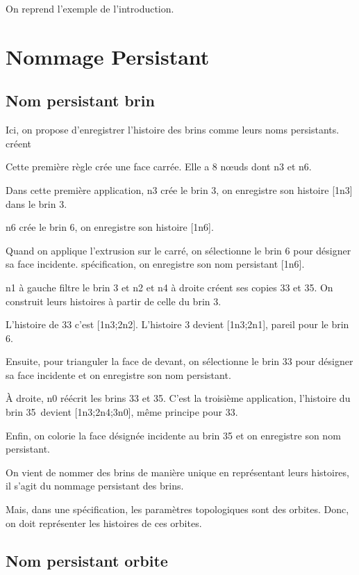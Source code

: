 \documentclass[11pt]{article}
\begin{document}
On reprend l'exemple de l'introduction.
\section{Nommage Persistant}
\label{sec:org84648da}

\subsection{Nom persistant brin}
\label{sec:org53f1b92}

Ici, on propose d'enregistrer l'histoire des brins comme leurs noms persistants.
créent %

Cette première règle crée une face carrée. Elle a 8 nœuds dont n3 et n6.

Dans cette première application, n3 crée le brin 3, on enregistre son histoire
[1n3] dans le brin 3.

n6 crée le brin 6, on enregistre son histoire [1n6].

Quand on applique l'extrusion sur le carré, on sélectionne le brin 6 pour
désigner sa face incidente. %
spécification, on enregistre son nom persistant [1n6].

n1 à gauche filtre le brin 3 et n2 et n4 à droite créent ses copies 33 et 35. %
On construit leurs histoires à partir de celle du brin 3. %

L'histoire de 33 c'est [1n3;2n2]. %
L'histoire 3 devient [1n3;2n1], pareil pour le brin 6. %

Ensuite, pour trianguler la face de devant, on sélectionne le brin 33 pour
désigner sa face incidente et on enregistre son nom persistant.

À droite, n0 réécrit les brins 33 et 35. C'est la troisième application,
l'histoire du brin 35 devient [1n3;2n4;3n0], même principe pour 33.

Enfin, on colorie la face désignée incidente au brin 35 et on enregistre son nom
persistant.

On vient de nommer des brins de manière unique en représentant leurs histoires,
il s'agit du nommage persistant des brins.

Mais, dans une spécification, les paramètres topologiques sont des orbites.
Donc, on doit représenter les histoires de ces orbites.

\subsection{Nom persistant orbite}
\label{sec:orgf5219a2}
\end{document}
